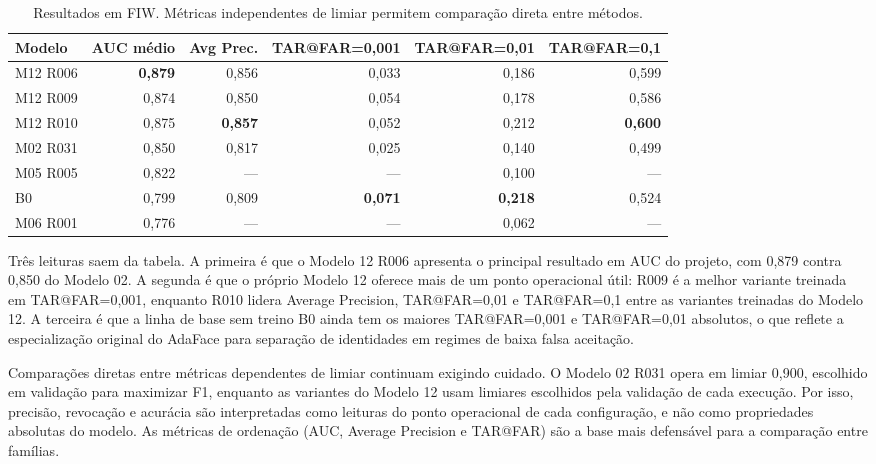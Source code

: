 \begin{table}[h]
\centering
\caption{Resultados em FIW. Métricas independentes de limiar permitem comparação direta entre métodos.}
\label{tab:fiw_main}
\begin{tabular}{lrrrrr}
\hline
\textbf{Modelo} & \textbf{AUC médio} & \textbf{Avg Prec.} & \textbf{TAR@FAR=0,001} & \textbf{TAR@FAR=0,01} & \textbf{TAR@FAR=0,1} \\
\hline
M12 R006 & \textbf{0{,}879} & 0{,}856          & 0{,}033          & 0{,}186          & 0{,}599 \\
M12 R009 & 0{,}874          & 0{,}850          & 0{,}054          & 0{,}178          & 0{,}586 \\
M12 R010 & 0{,}875          & \textbf{0{,}857} & 0{,}052          & 0{,}212          & \textbf{0{,}600} \\
M02 R031 & 0{,}850          & 0{,}817          & 0{,}025          & 0{,}140          & 0{,}499 \\
M05 R005 & 0{,}822          & ---              & ---              & 0{,}100          & --- \\
B0       & 0{,}799          & 0{,}809          & \textbf{0{,}071} & \textbf{0{,}218} & 0{,}524 \\
M06 R001 & 0{,}776          & ---              & ---              & 0{,}062          & --- \\
\hline
\end{tabular}
\end{table}

Três leituras saem da tabela. A primeira é que o Modelo 12 R006 apresenta o principal resultado em AUC do projeto, com 0,879 contra 0,850 do Modelo 02. A segunda é que o próprio Modelo 12 oferece mais de um ponto operacional útil: R009 é a melhor variante treinada em TAR@FAR=0,001, enquanto R010 lidera Average Precision, TAR@FAR=0,01 e TAR@FAR=0,1 entre as variantes treinadas do Modelo 12. A terceira é que a linha de base sem treino B0 ainda tem os maiores TAR@FAR=0,001 e TAR@FAR=0,01 absolutos, o que reflete a especialização original do AdaFace para separação de identidades em regimes de baixa falsa aceitação.

Comparações diretas entre métricas dependentes de limiar continuam exigindo cuidado. O Modelo 02 R031 opera em limiar 0,900, escolhido em validação para maximizar F1, enquanto as variantes do Modelo 12 usam limiares escolhidos pela validação de cada execução. Por isso, precisão, revocação e acurácia são interpretadas como leituras do ponto operacional de cada configuração, e não como propriedades absolutas do modelo. As métricas de ordenação (AUC, Average Precision e TAR@FAR) são a base mais defensável para a comparação entre famílias.

